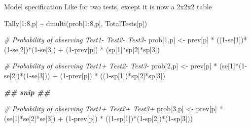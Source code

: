\documentclass[
  ignorenonframetext,
  aspectratio=169,
]{beamer}
\newenvironment{Shaded}{\begin{snugshade}}{\end{snugshade}}
\newcommand{\CommentTok}[1]{\textcolor[rgb]{0.56,0.35,0.01}{\textit{#1}}}
\newcommand{\DecValTok}[1]{\textcolor[rgb]{0.00,0.00,0.81}{#1}}
\newcommand{\DocumentationTok}[1]{\textcolor[rgb]{0.56,0.35,0.01}{\textbf{\textit{#1}}}}
\newcommand{\FunctionTok}[1]{\textcolor[rgb]{0.00,0.00,0.00}{#1}}
\newcommand{\NormalTok}[1]{#1}
\newcommand{\OtherTok}[1]{\textcolor[rgb]{0.56,0.35,0.01}{#1}}
\newcommand{\SpecialCharTok}[1]{\textcolor[rgb]{0.00,0.00,0.00}{#1}}
\begin{document}
\begin{frame}[fragile]{Model specification}
\protect\hypertarget{model-specification}{}
Like for two tests, except it is now a 2x2x2 table

\pause

\scriptsize

\begin{Shaded}
\begin{Highlighting}[]
\NormalTok{Tally[}\DecValTok{1}\SpecialCharTok{:}\DecValTok{8}\NormalTok{,p] }\SpecialCharTok{\textasciitilde{}} \FunctionTok{dmulti}\NormalTok{(prob[}\DecValTok{1}\SpecialCharTok{:}\DecValTok{8}\NormalTok{,p], TotalTests[p])}

\CommentTok{\# Probability of observing Test1{-} Test2{-} Test3{-}}
\NormalTok{prob[}\DecValTok{1}\NormalTok{,p] }\OtherTok{\textless{}{-}}\NormalTok{  prev[p] }\SpecialCharTok{*}\NormalTok{ ((}\DecValTok{1}\SpecialCharTok{{-}}\NormalTok{se[}\DecValTok{1}\NormalTok{])}\SpecialCharTok{*}\NormalTok{(}\DecValTok{1}\SpecialCharTok{{-}}\NormalTok{se[}\DecValTok{2}\NormalTok{])}\SpecialCharTok{*}\NormalTok{(}\DecValTok{1}\SpecialCharTok{{-}}\NormalTok{se[}\DecValTok{3}\NormalTok{]) }\SpecialCharTok{+}
\NormalTok{              (}\DecValTok{1}\SpecialCharTok{{-}}\NormalTok{prev[p]) }\SpecialCharTok{*}\NormalTok{ (sp[}\DecValTok{1}\NormalTok{]}\SpecialCharTok{*}\NormalTok{sp[}\DecValTok{2}\NormalTok{]}\SpecialCharTok{*}\NormalTok{sp[}\DecValTok{3}\NormalTok{])}

\CommentTok{\# Probability of observing Test1+ Test2{-} Test3{-}}
\NormalTok{prob[}\DecValTok{2}\NormalTok{,p] }\OtherTok{\textless{}{-}}\NormalTok{  prev[p] }\SpecialCharTok{*}\NormalTok{ (se[}\DecValTok{1}\NormalTok{]}\SpecialCharTok{*}\NormalTok{(}\DecValTok{1}\SpecialCharTok{{-}}\NormalTok{se[}\DecValTok{2}\NormalTok{])}\SpecialCharTok{*}\NormalTok{(}\DecValTok{1}\SpecialCharTok{{-}}\NormalTok{se[}\DecValTok{3}\NormalTok{])) }\SpecialCharTok{+}
\NormalTok{              (}\DecValTok{1}\SpecialCharTok{{-}}\NormalTok{prev[p]) }\SpecialCharTok{*}\NormalTok{ ((}\DecValTok{1}\SpecialCharTok{{-}}\NormalTok{sp[}\DecValTok{1}\NormalTok{])}\SpecialCharTok{*}\NormalTok{sp[}\DecValTok{2}\NormalTok{]}\SpecialCharTok{*}\NormalTok{sp[}\DecValTok{3}\NormalTok{])}

\DocumentationTok{\#\# snip \#\#}

\CommentTok{\# Probability of observing Test1+ Test2+ Test3+}
\NormalTok{prob[}\DecValTok{3}\NormalTok{,p] }\OtherTok{\textless{}{-}}\NormalTok{  prev[p] }\SpecialCharTok{*}\NormalTok{ (se[}\DecValTok{1}\NormalTok{]}\SpecialCharTok{*}\NormalTok{se[}\DecValTok{2}\NormalTok{]}\SpecialCharTok{*}\NormalTok{se[}\DecValTok{3}\NormalTok{]) }\SpecialCharTok{+}
\NormalTok{              (}\DecValTok{1}\SpecialCharTok{{-}}\NormalTok{prev[p]) }\SpecialCharTok{*}\NormalTok{ ((}\DecValTok{1}\SpecialCharTok{{-}}\NormalTok{sp[}\DecValTok{1}\NormalTok{])}\SpecialCharTok{*}\NormalTok{(}\DecValTok{1}\SpecialCharTok{{-}}\NormalTok{sp[}\DecValTok{2}\NormalTok{])}\SpecialCharTok{*}\NormalTok{(}\DecValTok{1}\SpecialCharTok{{-}}\NormalTok{sp[}\DecValTok{3}\NormalTok{]))}
\end{Highlighting}
\end{Shaded}


\end{frame}
\end{document}
